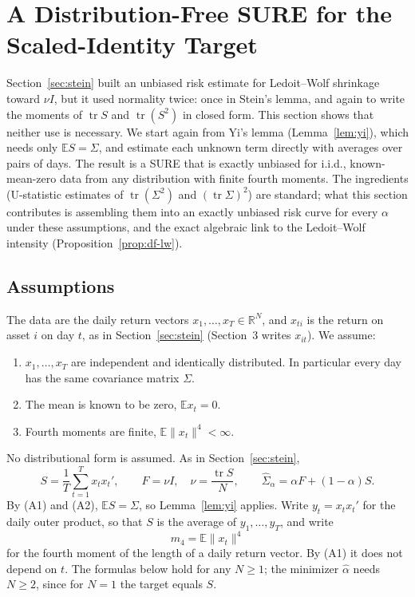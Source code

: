 \section{A Distribution-Free SURE for the Scaled-Identity Target}\label{sec:df-sure}

Section~\ref{sec:stein} built an unbiased risk estimate for Ledoit--Wolf shrinkage toward $\nu I$, but it used normality twice: once in Stein's lemma, and again to write the moments of $\operatorname{tr}S$ and $\operatorname{tr}(S^2)$ in closed form. This section shows that neither use is necessary. We start again from Yi's lemma (Lemma~\ref{lem:yi}), which needs only $\mathbb{E}S = \Sigma$, and estimate each unknown term directly with averages over pairs of days. The result is a SURE that is exactly unbiased for i.i.d., known-mean-zero data from any distribution with finite fourth moments. The ingredients (U-statistic estimates of $\operatorname{tr}(\Sigma^2)$ and $(\operatorname{tr}\Sigma)^2$) are standard; what this section contributes is assembling them into an exactly unbiased risk curve for every $\alpha$ under these assumptions, and the exact algebraic link to the Ledoit--Wolf intensity (Proposition~\ref{prop:df-lw}).

\subsection{Assumptions}

The data are the daily return vectors $x_1, \dots, x_T \in \mathbb{R}^N$, and $x_{ti}$ is the return on asset $i$ on day $t$, as in Section~\ref{sec:stein} (Section~3 writes $x_{it}$). We assume:
\begin{enumerate}
  \item[(A1)] $x_1, \dots, x_T$ are independent and identically distributed. In particular every day has the same covariance matrix $\Sigma$.
  \item[(A2)] The mean is known to be zero, $\mathbb{E}x_t = 0$.
  \item[(A3)] Fourth moments are finite, $\mathbb{E}\|x_t\|^4 < \infty$.
\end{enumerate}
No distributional form is assumed. As in Section~\ref{sec:stein},
\[
  S = \frac{1}{T}\sum_{t=1}^T x_t x_t', \qquad
  F = \nu I, \quad \nu = \frac{\operatorname{tr}S}{N}, \qquad
  \hat\Sigma_\alpha = \alpha F + (1-\alpha)S .
\]
By (A1) and (A2), $\mathbb{E}S = \Sigma$, so Lemma~\ref{lem:yi} applies. Write $y_t = x_t x_t'$ for the daily outer product, so that $S$ is the average of $y_1, \dots, y_T$, and write
\[
  m_4 = \mathbb{E}\|x_t\|^4
\]
for the fourth moment of the length of a daily return vector. By (A1) it does not depend on $t$. The formulas below hold for any $N \ge 1$; the minimizer $\hat\alpha$ needs $N \ge 2$, since for $N = 1$ the target equals $S$.

